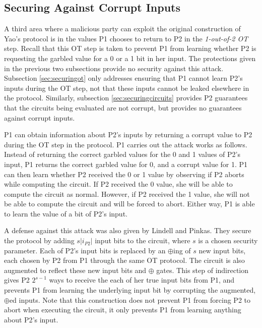 \subsection{Securing Against Corrupt Inputs}

A third area where a malicious party can exploit the original construction of Yao's protocol is in the values \ac{P1} chooses to return to \ac{P2} in the \emph{1-out-of-2 \ac{OT}} step.  Recall that this \ac{OT} step is taken to prevent \ac{P1} from learning whether \ac{P2} is requesting the garbled value for a 0 or a 1 bit in her input.  The protections given in the previous two subsections provide no security against this attack. Subsection \ref{sec:securingot} only addresses ensuring that \ac{P1} cannot learn \ac{P2}'s inputs during the \ac{OT} step, not that these inputs cannot be leaked elsewhere in the protocol.  Similarly, subsection \ref{sec:securingcircuits} provides \ac{P2} guarantees that the circuits being evaluated are not corrupt, but provides no guarantees against corrupt inputs.

\ac{P1} can obtain information about \ac{P2}'s inputs by returning a corrupt value to \ac{P2} during the \ac{OT} step in the protocol.  \ac{P1} carries out the attack works as follows.  Instead of returning the correct garbled values for the 0 and 1 values of \ac{P2}'s input, \ac{P1} returns the correct garbled value for 0, and a corrupt value for 1.  \ac{P1} can then learn whether \ac{P2} received the 0 or 1 value by observing if \ac{P2} aborts while computing the circuit.  If \ac{P2} received the 0 value, she will be able to compute the circuit as normal.  However, if \ac{P2} received the 1 value, she will not be able to compute the circuit and will be forced to abort.  Either way, \ac{P1} is able to learn the value of a bit of \ac{P2}'s input.

A defense against this attack was also given by Lindell and Pinkas\cite{lindell2007efficient}.  They secure the protocol by adding $s|i_{P2}|$ input bits to the circuit, where $s$ is a chosen security parameter.  Each of \ac{P2}'s input bits is replaced by an $\oplus$ing of $s$ new input bits, each chosen by \ac{P2} from \ac{P1} through the same \ac{OT} protocol.  The circuit is also augmented to reflect these new input bits and $\oplus$ gates. This step of indirection gives \ac{P2} $2^{s-1}$ ways to receive the each of her true input bits from \ac{P1}, and prevents \ac{P1} from learning the underlying input bit by corrupting the augmented, $\oplus$ed inputs.  Note that this construction does not prevent \ac{P1} from forcing \ac{P2} to abort when executing the circuit, it only prevents \ac{P1} from learning anything about \ac{P2}'s input.
